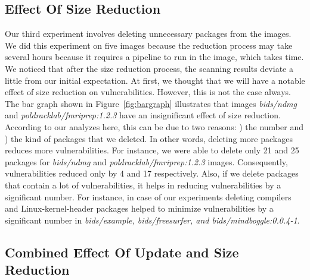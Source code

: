 \documentclass[a4paper,num-refs]{oup-contemporary}
\newcommand{\rom}[1]{\lowercase\expandafter{\romannumeral #1\relax}}
\begin{document}

\subsection{Effect Of Size Reduction}

Our third experiment involves deleting unnecessary packages from the images.
We did this experiment on five images because the reduction process may take
several hours because it requires 
a pipeline to run in the image, which takes time. We noticed that
after the size reduction process, the scanning results deviate a little from our initial expectation.
At first, we thought that we will have a notable effect of size reduction on
vulnerabilities. However, this is not the case always. The bar graph shown in
Figure~\ref{fig:bargraph} illustrates that images \textit{bids/ndmg} and
\textit{poldracklab/fmriprep:1.2.3} have an insignificant effect of size reduction.
According to our analyzes here, this can be due to two reasons: \rom{1}) the number
and \rom{2}) the kind of packages that we deleted. In other
words, deleting more packages reduces more vulnerabilities. 
For instance, we were able to delete only 21 and 25 packages for 
\textit{bids/ndmg} and \textit{poldracklab/fmriprep:1.2.3} images. Consequently, vulnerabilities
reduced only by 4 and 17 respectively. 
Also, if we delete packages that contain a lot of vulnerabilities, it helps in reducing
vulnerabilities by a significant number. For instance, in case of our experiments
deleting compilers and Linux-kernel-header packages helped to minimize vulnerabilities
by a significant number in \textit{bids/example, bids/freesurfer, and bids/mindboggle:0.0.4-1}. 

\subsection{Combined Effect Of Update and Size Reduction}
\end{document}
